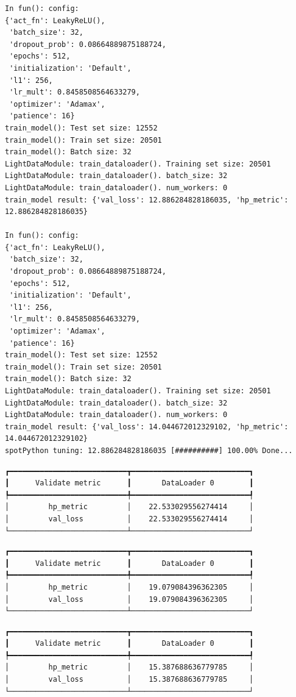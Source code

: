 \documentclass[
  letterpaper,
  DIV=11,
  numbers=noendperiod]{scrreprt}
\begin{document}
\begin{verbatim}
In fun(): config:
{'act_fn': LeakyReLU(),
 'batch_size': 32,
 'dropout_prob': 0.08664889875188724,
 'epochs': 512,
 'initialization': 'Default',
 'l1': 256,
 'lr_mult': 0.8458508564633279,
 'optimizer': 'Adamax',
 'patience': 16}
train_model(): Test set size: 12552
train_model(): Train set size: 20501
train_model(): Batch size: 32
LightDataModule: train_dataloader(). Training set size: 20501
LightDataModule: train_dataloader(). batch_size: 32
LightDataModule: train_dataloader(). num_workers: 0
train_model result: {'val_loss': 12.886284828186035, 'hp_metric': 12.886284828186035}

In fun(): config:
{'act_fn': LeakyReLU(),
 'batch_size': 32,
 'dropout_prob': 0.08664889875188724,
 'epochs': 512,
 'initialization': 'Default',
 'l1': 256,
 'lr_mult': 0.8458508564633279,
 'optimizer': 'Adamax',
 'patience': 16}
train_model(): Test set size: 12552
train_model(): Train set size: 20501
train_model(): Batch size: 32
LightDataModule: train_dataloader(). Training set size: 20501
LightDataModule: train_dataloader(). batch_size: 32
LightDataModule: train_dataloader(). num_workers: 0
train_model result: {'val_loss': 14.044672012329102, 'hp_metric': 14.044672012329102}
spotPython tuning: 12.886284828186035 [##########] 100.00% Done...
\end{verbatim}

\begin{verbatim}
┏━━━━━━━━━━━━━━━━━━━━━━━━━━━┳━━━━━━━━━━━━━━━━━━━━━━━━━━━┓
┃      Validate metric      ┃       DataLoader 0        ┃
┡━━━━━━━━━━━━━━━━━━━━━━━━━━━╇━━━━━━━━━━━━━━━━━━━━━━━━━━━┩
│         hp_metric         │    22.533029556274414     │
│         val_loss          │    22.533029556274414     │
└───────────────────────────┴───────────────────────────┘
\end{verbatim}

\begin{verbatim}
┏━━━━━━━━━━━━━━━━━━━━━━━━━━━┳━━━━━━━━━━━━━━━━━━━━━━━━━━━┓
┃      Validate metric      ┃       DataLoader 0        ┃
┡━━━━━━━━━━━━━━━━━━━━━━━━━━━╇━━━━━━━━━━━━━━━━━━━━━━━━━━━┩
│         hp_metric         │    19.079084396362305     │
│         val_loss          │    19.079084396362305     │
└───────────────────────────┴───────────────────────────┘
\end{verbatim}

\begin{verbatim}
┏━━━━━━━━━━━━━━━━━━━━━━━━━━━┳━━━━━━━━━━━━━━━━━━━━━━━━━━━┓
┃      Validate metric      ┃       DataLoader 0        ┃
┡━━━━━━━━━━━━━━━━━━━━━━━━━━━╇━━━━━━━━━━━━━━━━━━━━━━━━━━━┩
│         hp_metric         │    15.387688636779785     │
│         val_loss          │    15.387688636779785     │
└───────────────────────────┴───────────────────────────┘
\end{verbatim}
\end{document}
